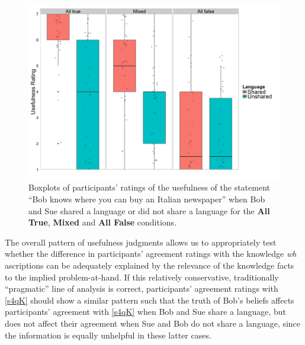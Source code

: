 \documentclass[a4paper]{article}
\begin{document}
\begin{figure}[h!]
\centering
\includegraphics[width=14cm] {Fig4a}
\captionsetup{width=0.9\textwidth}
\caption{Boxplots of participants' ratings of the usefulness of the statement ``Bob knows where you can buy an Italian newspaper'' when Bob and Sue shared a language or did not share a language for the \textbf{All True}, \textbf{Mixed} and \textbf{All False} conditions.}
\label{fig:Fig4}
\end{figure}

The overall pattern of usefulness judgments allows us to appropriately test whether the difference in participants' agreement ratings with the knowledge \textit{wh} ascriptions can be adequately explained by the relevance of the knowledge facts to the implied problem-at-hand. If this relatively conservative, traditionally ``pragmatic'' line of analysis is correct, participants' agreement ratings with \ref{s4qK} should show a similar pattern such that the truth of Bob's beliefs affects participants' agreement with \ref{s4qK} when Bob and Sue share a language, but does not affect their agreement when Sue and Bob do not share a language, since the information is equally unhelpful in these latter cases.
\end{document}
